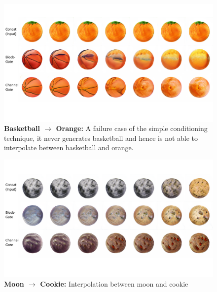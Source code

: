 \documentclass[10pt,twocolumn,letterpaper]{article}
\begin{document}
\begin{figure}[t]
    \centering
    \includegraphics[width=\linewidth]{interpolation-orange-basketball.pdf}
    \caption{ {\bf Basketball $\rightarrow$ Orange:} A failure case of the simple conditioning technique, it never generates basketball and hence is not able to interpolate between basketball and orange. }
    \label{fig:inter_orange_basketball}
    \vspace{-3mm}
\end{figure}

\begin{figure}[t]
    \centering
    \includegraphics[width=\linewidth]{interpolation-cookie-moon.pdf}
    \caption{ {\bf Moon $\rightarrow$ Cookie:} Interpolation between moon and cookie }
    \label{fig:inter_cookie_moon}
    \vspace{-3mm}
\end{figure}
\end{document}
